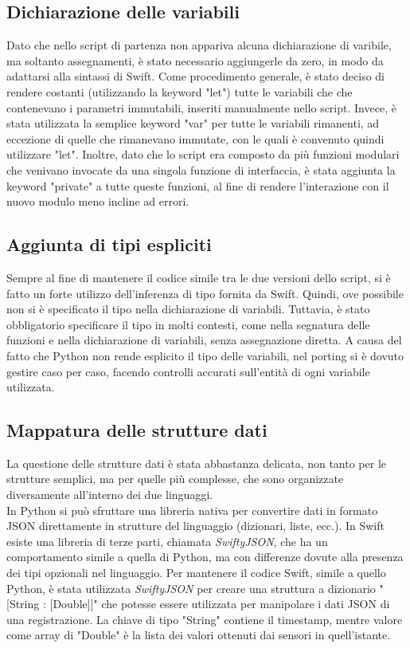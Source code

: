 \subsection{Dichiarazione delle variabili}

Dato che nello script di partenza non appariva alcuna dichiarazione di varibile,
ma soltanto assegnamenti, è stato necessario aggiungerle da zero, in modo da 
adattarsi alla sintassi di Swift. Come procedimento generale, è stato deciso
di rendere costanti (utilizzando la keyword "let") tutte le variabili che 
che contenevano i parametri immutabili, inseriti manualmente nello script.
Invece, è stata utilizzata la semplice keyword "var" per tutte le variabili 
rimanenti, ad eccezione di quelle che rimanevano immutate, con le quali è 
convenuto quindi utilizzare "let". Inoltre, dato che lo script era composto 
da più funzioni modulari che venivano invocate da una singola funzione di
interfaccia, è stata aggiunta la keyword "private" a tutte queste funzioni,
al fine di rendere l'interazione con il nuovo modulo meno incline ad errori.

\subsection{Aggiunta di tipi espliciti}

Sempre al fine di mantenere il codice simile tra le due versioni dello script,
si è fatto un forte utilizzo dell'inferenza di tipo fornita da Swift. Quindi,
ove possibile non si è specificato il tipo nella dichiarazione di variabili.
Tuttavia, è stato obbligatorio specificare il tipo in molti contesti, come
nella segnatura delle funzioni e nella dichiarazione di variabili, senza 
assegnazione diretta. A causa del fatto che Python non rende esplicito
il tipo delle variabili, nel porting si è dovuto gestire caso per caso,
facendo controlli accurati sull'entità di ogni variabile utilizzata.

\subsection{Mappatura delle strutture dati}

La questione delle strutture dati è stata abbastanza delicata, non tanto
per le strutture semplici, ma per quelle più complesse, che sono 
organizzate diversamente all'interno dei due linguaggi.\\
In Python si può sfruttare una libreria nativa per convertire dati in 
formato JSON direttamente in strutture del linguaggio (dizionari, liste, ecc.).
In Swift esiste una libreria di terze parti, chiamata \emph{SwiftyJSON}, che
ha un comportamento simile a quella di Python, ma con differenze dovute alla
presenza dei tipi opzionali nel linguaggio. Per mantenere il codice Swift, simile
a quello Python, è stata utilizzata \emph{SwiftyJSON} per creare una struttura a 
dizionario "[String : [Double]]" che potesse essere utilizzata per manipolare i 
dati JSON di una registrazione. La chiave di tipo "String" contiene il timestamp,
mentre valore come array di "Double" è la lista dei valori ottenuti dai sensori in 
quell'istante. 

